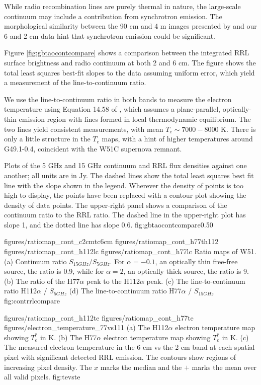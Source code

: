While radio recombination lines are purely thermal in nature, the large-scale
continuum may include a contribution from synchrotron emission.  The
morphological similarity between the 90 cm and 4 m images presented by
\citet{Brogan2013a} and our 6 and 2 cm data hint that synchrotron emission
could be significant.

Figure \ref{fig:gbtaocontcompare} shows a comparison between the integrated RRL
surface brightness and radio continuum at both 2 and 6 cm.  The figure shows
the total least squares best-fit slopes to the data assuming uniform error,
which yield a measurement of the line-to-continuum ratio.

We use the line-to-continuum ratio in both bands to measure the electron
temperature using Equation 14.58 of \citet{Wilson2009a}, which assumes a
plane-parallel, optically-thin emission region with lines formed in local
thermodynamic equilibrium.  The two lines yield consistent measurements, with
mean $T_e\sim7000-8000$ K.  There is only a little structure in the $T_e$ maps,
with a hint of higher temperatures around G49.1-0.4, coincident with the W51C
supernova remnant.



{Plots of the 5 GHz and 15 GHz continuum and RRL flux densities against one
another; all units are in Jy.  The dashed lines show the total least squares
best fit line with the slope shown in the legend.  Wherever the density of
points is too high to display, the points have been replaced with a contour
plot showing the density of data points.  The upper-right panel shows a
comparison of the continuum ratio to the RRL ratio.  The dashed line in the
upper-right plot has slope 1, and the dotted line has slope 0.6.}
{fig:gbtaocontcompare}{0.5}{0}

\clearpage
\FigureFour
{figures/ratiomap_cont_c2cmtc6cm}
{figures/ratiomap_cont_h77th112}
{figures/ratiomap_cont_h112lc}
{figures/ratiomap_cont_h77lc}
{Ratio maps of W51.  
(a) Continuum ratio $S_{15 GHz} / S_{5 GHz}$.  For $\alpha=-0.1$, an optically
thin free-free source, the ratio is 0.9, while for $\alpha=2$, an optically thick source,
the ratio is 9.
(b) The ratio of the H77$\alpha$ peak to the H112$\alpha$ peak.
(c) The line-to-continuum ratio H112$\alpha$ / $S_{5 GHz}$
(d) The line-to-continuum ratio H77$\alpha$ / $S_{15 GHz}$
}
{fig:contrrlcompare}

\FigureThreePDF
{figures/ratiomap_cont_h112te}
{figures/ratiomap_cont_h77te}
{figures/electron_temperature_77vs111}
{(a) The H112$\alpha$ electron temperature map showing $T_e^*$ in K. 
(b) The H77$\alpha$ electron temperature map showing $T_e^*$ in K.
(c) The measured electron temperature in the 6 cm vs the 2 cm band at each spatial
pixel with significant detected RRL emission.  The contours show regions of
increasing pixel density.  The $x$ marks the median and the $+$ marks the mean
over all valid pixels.
}
{fig:tevste}%
\clearpage

